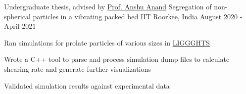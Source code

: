 \begin{cventries}
\cventrylast
    {Undergraduate thesis, advised by \href{https://ch.iitr.ac.in/~CH/Anshu_Anand}{Prof. Anshu Anand}}
    {Segregation of  non-spherical particles in a vibrating packed bed}
    {IIT Roorkee, India}
    {August 2020 - April 2021}
    {
      \begin{cvitems}
      \item {Ran simulations for prolate particles of various sizes in \href{https://www.cfdem.com/liggghts-open-source-discrete-element-method-particle-simulation-code}{LIGGGHTS}}
      \item {Wrote a C++ tool to parse and process simulation dump files to calculate shearing rate and generate further visualizations}
      \item {Validated simulation results against experimental data}
      \end{cvitems} 
    }
\end{cventries}
